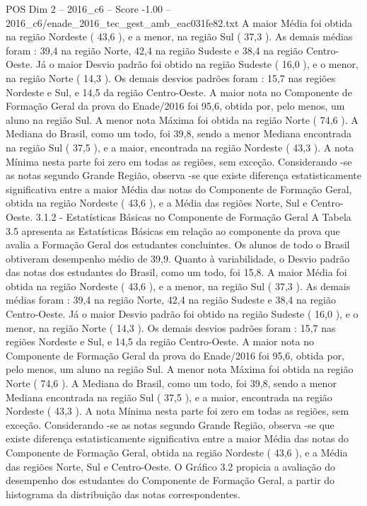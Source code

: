 \begin{textsample}{POS Dim 2 – 2016\_c6 – Score -1.00 – 2016\_c6/enade\_2016\_tec\_gest\_amb\_eac031fe82.txt}
A maior Média foi obtida na região Nordeste ( 43,6 ), e a menor, na região Sul ( 37,3 ).
As demais médias foram : 39,4 na região Norte, 42,4 na região Sudeste e 38,4 na região Centro-Oeste.
Já o maior Desvio padrão foi obtido na região Sudeste ( 16,0 ), e o menor, na região Norte ( 14,3 ).
Os demais desvios padrões foram : 15,7 nas regiões Nordeste e Sul, e 14,5 da região Centro-Oeste.
A maior nota no Componente de Formação Geral da prova do Enade/2016 foi 95,6, obtida por, pelo menos, um aluno na região Sul.
A menor nota Máxima foi obtida na região Norte ( 74,6 ).
A Mediana do Brasil, como um todo, foi 39,8, sendo a menor Mediana encontrada na região Sul ( 37,5 ), e a maior, encontrada na região Nordeste ( 43,3 ).
A nota Mínima nesta parte foi zero em todas as regiões, sem exceção.
Considerando -se as notas segundo Grande Região, observa -se que existe diferença estatisticamente significativa entre a maior Média das notas do Componente de Formação Geral, obtida na região Nordeste ( 43,6 ), e a Média das regiões Norte, Sul e Centro-Oeste. 3.1.2 - Estatísticas Básicas no Componente de Formação Geral A Tabela 3.5 apresenta as Estatísticas Básicas em relação ao componente da prova que avalia a Formação Geral dos estudantes concluintes.
Os alunos de todo o Brasil obtiveram desempenho médio de 39,9.
Quanto à variabilidade, o Desvio padrão das notas dos estudantes do Brasil, como um todo, foi 15,8.
A maior Média foi obtida na região Nordeste ( 43,6 ), e a menor, na região Sul ( 37,3 ).
As demais médias foram : 39,4 na região Norte, 42,4 na região Sudeste e 38,4 na região Centro-Oeste.
Já o maior Desvio padrão foi obtido na região Sudeste ( 16,0 ), e o menor, na região Norte ( 14,3 ).
Os demais desvios padrões foram : 15,7 nas regiões Nordeste e Sul, e 14,5 da região Centro-Oeste.
A maior nota no Componente de Formação Geral da prova do Enade/2016 foi 95,6, obtida por, pelo menos, um aluno na região Sul.
A menor nota Máxima foi obtida na região Norte ( 74,6 ).
A Mediana do Brasil, como um todo, foi 39,8, sendo a menor Mediana encontrada na região Sul ( 37,5 ), e a maior, encontrada na região Nordeste ( 43,3 ).
A nota Mínima nesta parte foi zero em todas as regiões, sem exceção.
Considerando -se as notas segundo Grande Região, observa -se que existe diferença estatisticamente significativa entre a maior Média das notas do Componente de Formação Geral, obtida na região Nordeste ( 43,6 ), e a Média das regiões Norte, Sul e Centro-Oeste.
O Gráfico 3.2 propicia a avaliação do desempenho dos estudantes do Componente de Formação Geral, a partir do histograma da distribuição das notas correspondentes.

\end{textsample}
